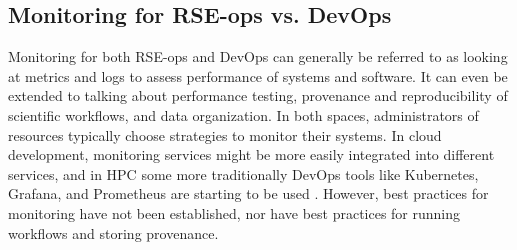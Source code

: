 \subsection{Monitoring for RSE-ops vs. DevOps}

Monitoring for both RSE-ops and DevOps can generally be referred to as looking at metrics and logs to assess performance of systems and software. It can even be extended to talking about performance testing, provenance and reproducibility of scientific workflows, and data organization. In both spaces, administrators of resources typically choose strategies to monitor their systems. In cloud development, monitoring services might be more easily integrated into different services, and in HPC some more traditionally DevOps tools like Kubernetes, Grafana, and Prometheus are starting to be used \cite{k8}. However, best practices for monitoring have not been established, nor have best practices for running workflows and storing provenance.
